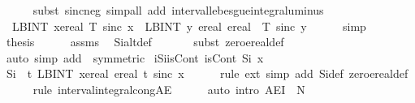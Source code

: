 \documentclass[leqno]{article}
\theoremstyle{definition}
\begin{document}
\begin{isabellebody}
\ \ \ \ \isamarkupfalse%
\ {\isacharparenleft}subst\ sinc{\isacharunderscore}neg{\isacharparenright}\ {\isacharparenleft}simp{\isacharunderscore}all\ add{\isacharcolon}\ interval{\isacharunderscore}lebesgue{\isacharunderscore}integral{\isacharunderscore}uminus{\isacharparenright}\isanewline
\ \ \isamarkupfalse%
\ \isamarkupfalse%
\ {\isacharasterisk}{\isacharcolon}\ {\isachardoublequoteopen}{\isacharminus}{\isacharparenleft}LBINT\ x{\isacharequal}ereal\ {}{\isachardot}{\isachardot}T{\isachardot}\ sinc\ x{\isacharparenright}\ {\isacharequal}\ LBINT\ y{\isacharequal}\ ereal\ {}{\isachardot}{\isachardot}ereal\ {\isacharparenleft}{\isacharminus}\ T{\isacharparenright}{\isachardot}\ sinc\ y{\isachardoublequoteclose}\isanewline
\ \ \ \ \isamarkupfalse%
\ simp\isanewline
\ \ \isamarkupfalse%
\ {\isacharquery}thesis\isanewline
\ \ \ \ \isamarkupfalse%
\ assms\ \isamarkupfalse%
\ Si{\isacharunderscore}alt{\isacharunderscore}def\isanewline
\ \ \ \ \ \isamarkupfalse%
\ {\isacharparenleft}subst\ zero{\isacharunderscore}ereal{\isacharunderscore}def{\isacharparenright}{\isacharplus}\isanewline
\ \ \ \ \ \isamarkupfalse%
\ {\isacharparenleft}auto\ simp\ add{\isacharcolon}\ {\isacharasterisk}\ {\isacharbrackleft}symmetric{\isacharbrackright}{\isacharparenright}\isanewline
{}\isamarkupfalse%
\isanewline
\isanewline
\isanewline
{}\isamarkupfalse%
\ iSi{\isacharunderscore}isCont{\isacharcolon}\ {\isachardoublequoteopen}isCont\ Si\ x{\isachardoublequoteclose}\isanewline
{}\isamarkupfalse%
\ {\isacharminus}\isanewline
\ \ \isamarkupfalse%
\ {\isachardoublequoteopen}Si\ {\isacharequal}\ {\isacharparenleft}{\isasymlambda}t{\isachardot}\ LBINT\ x{\isacharequal}ereal\ {}{\isachardot}{\isachardot}ereal\ t{\isachardot}\ sinc\ x{\isacharparenright}{\isachardoublequoteclose}\isanewline
\ \ \ \ \isamarkupfalse%
\ {\isacharparenleft}rule\ ext{\isacharcomma}\ simp\ add{\isacharcolon}\ Si{\isacharunderscore}def\ zero{\isacharunderscore}ereal{\isacharunderscore}def{\isacharparenright}\isanewline
\ \ \ \ \isamarkupfalse%
\ {\isacharparenleft}rule\ interval{\isacharunderscore}integral{\isacharunderscore}cong{\isacharunderscore}AE{\isacharparenright}\isanewline
\ \ \ \ \isamarkupfalse%
\ {\isacharparenleft}auto\ intro{\isacharbang}{\isacharcolon}\ AE{\isacharunderscore}I{\isacharprime}\ {\isacharbrackleft}\ N\ {\isacharequal}\ {\isachardoublequoteopen}{\isacharbraceleft}{}{\isacharbraceright}{\isachardoublequoteclose}{\isacharbrackright}{\isacharparenright}\isanewline

\end{isabellebody}
\end{document}
